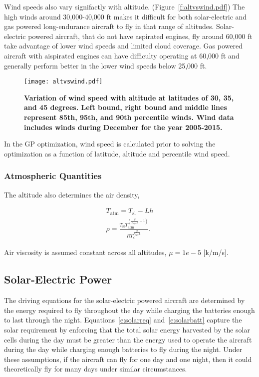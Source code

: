 \documentclass[]{aiaa-tc}%
\begin{document}
Wind speeds also vary signifactly with altitude. (Figure~\ref{f:altvswind.pdf})
The high winds around 30,000-40,000 ft makes it difficult for both solar-electric and gas powered long-endurance aircraft to fly in that range of altitudes.  
Solar-electric powered aircraft, that do not have aspirated engines, fly around 60,000 ft take advantage of lower wind speeds and limited cloud coverage.
Gas powered aircraft with aispirated engines can have difficulty operating at 60,000 ft and generally perform better in the lower wind speeds below 25,000 ft.

\begin{figure}[H]
	\begin{center}
	\texttt{[image: altvswind.pdf]}
    \caption{ \textbf{ Variation of wind speed with altitude at latitudes of 30, 35, and 45 degrees.  Left bound, right bound and middle lines represent 85th, 95th, and 90th percentile winds. Wind data includes winds during December for the year 2005-2015.}}
	\label{f:altvswind}
	\end{center}
\end{figure}

In the GP optimization, wind speed is calculated prior to solving the optimization as a function of latitude, altitude and percentile wind speed. 

\subsubsection{Atmospheric Quantities}

The altitude also determines the air density,\cite{density}

\begin{align}
    \label{e:Talt}
    T_{\text{atm}} = T_{\text{sl}} - Lh \\
    \label{e:rhot}
    \rho = \frac{T_{\text{sl}}T_{\text{atm}}^{\left( \frac{g}{R_{\text{spec}}L} -1 \right)}}{R T_{\text{sl}}^{\frac{g}{R_{\text{spec}}L}}}.
\end{align}

Air viscosity is assumed constant across all altitudes, $\mu=1e-5$ [k/m/s].

\subsection{Solar-Electric Power}

The driving equations for the solar-electric powered aircraft are determined by the energy required to fly throughout the day while charging the batteries enough to last through the night.  
Equations~\ref{e:solarreq} and~\ref{e:solarbatt} capture the solar requirement by enforcing that the total solar energy harvested by the solar cells during the day must be greater than the energy used to operate the aircraft during the day while charging enough batteries to fly during the night. 
Under these assumptions, if the aircraft can fly for one day and one night, then it could theoretically fly for many days under similar circumstances. 
\end{document}
